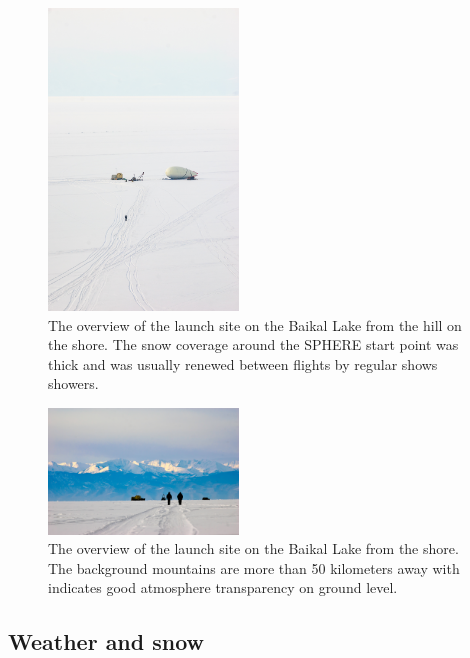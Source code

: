 \documentclass[final,5p,times,twocolumn]{elsarticle}
\begin{document}
\begin{figure}[tb]
\begin{center}
    \includegraphics[trim=1cm 5cm 0cm 5cm,clip,width=0.45\textwidth]{DSC_4049.jpg}\hspace{2pc}%
    \caption{The overview of the launch site on the Baikal Lake from the hill on the shore. The snow coverage around the SPHERE start point was thick and was usually renewed between flights by regular shows showers.}
\label{fig:baikal_snow}
\end{center}
\end{figure}
\begin{figure}[tb]
\begin{center}
    \includegraphics[width=0.45\textwidth]{DSC_7423.jpg}\hspace{2pc}%
    \caption{The overview of the launch site on the Baikal Lake from the shore. The background mountains are more than 50 kilometers away with indicates good atmosphere transparency on ground level.}
\label{fig:baikal_atmo}
\end{center}
\end{figure}

\subsection{Weather and snow}
\end{document}
